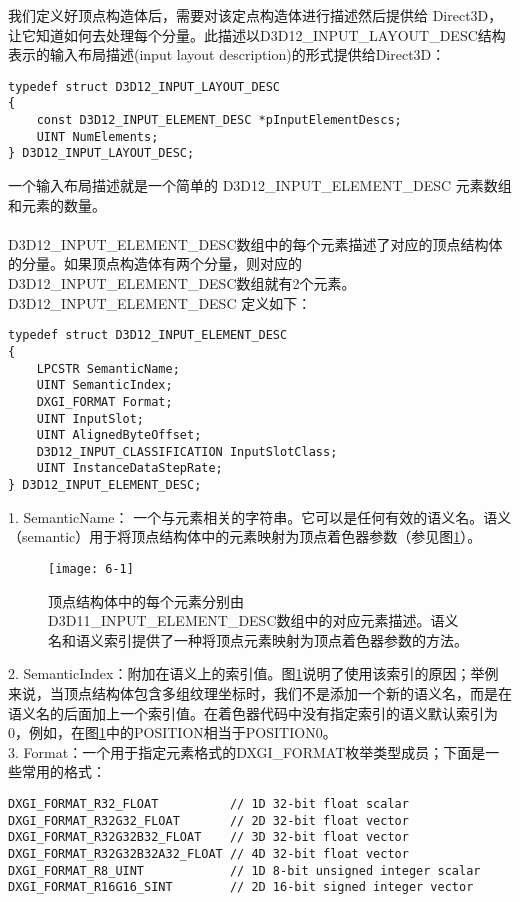 \begin{flushleft}
我们定义好顶点构造体后，需要对该定点构造体进行描述然后提供给 Direct3D，让它知道如何去处理每个分量。此描述以D3D12\_INPUT\_LAYOUT\_DESC结构表示的输入布局描述(input layout description)的形式提供给Direct3D：
\begin{lstlisting}
typedef struct D3D12_INPUT_LAYOUT_DESC
{
    const D3D12_INPUT_ELEMENT_DESC *pInputElementDescs;
    UINT NumElements;
} D3D12_INPUT_LAYOUT_DESC;
\end{lstlisting}
一个输入布局描述就是一个简单的 D3D12\_INPUT\_ELEMENT\_DESC 元素数组和元素的数量。\\
~\\
D3D12\_INPUT\_ELEMENT\_DESC数组中的每个元素描述了对应的顶点结构体的分量。如果顶点构造体有两个分量，则对应的 D3D12\_INPUT\_ELEMENT\_DESC数组就有2个元素。D3D12\_INPUT\_ELEMENT\_DESC 定义如下：
\begin{lstlisting}
typedef struct D3D12_INPUT_ELEMENT_DESC
{
    LPCSTR SemanticName;
    UINT SemanticIndex;
    DXGI_FORMAT Format;
    UINT InputSlot;
    UINT AlignedByteOffset;
    D3D12_INPUT_CLASSIFICATION InputSlotClass;
    UINT InstanceDataStepRate;
} D3D12_INPUT_ELEMENT_DESC;
\end{lstlisting}
1. SemanticName： 一个与元素相关的字符串。它可以是任何有效的语义名。语义（semantic）用于将顶点结构体中的元素映射为顶点着色器参数（参见图\ref{fig:6-1}）。\\
\begin{figure}[h]
    \texttt{[image: 6-1]}
    \centering
    \caption{顶点结构体中的每个元素分别由D3D11\_INPUT\_ELEMENT\_DESC数组中的对应元素描述。语义名和语义索引提供了一种将顶点元素映射为顶点着色器参数的方法。}
    \label{fig:6-1}
\end{figure}
2. SemanticIndex：附加在语义上的索引值。图\ref{fig:6-1}说明了使用该索引的原因；举例来说，当顶点结构体包含多组纹理坐标时，我们不是添加一个新的语义名，而是在语义名的后面加上一个索引值。在着色器代码中没有指定索引的语义默认索引为0，例如，在图\ref{fig:6-1}中的POSITION相当于POSITION0。\\
3. Format：一个用于指定元素格式的DXGI\_FORMAT枚举类型成员；下面是一些常用的格式：
\begin{lstlisting}
DXGI_FORMAT_R32_FLOAT          // 1D 32-bit float scalar
DXGI_FORMAT_R32G32_FLOAT       // 2D 32-bit float vector
DXGI_FORMAT_R32G32B32_FLOAT    // 3D 32-bit float vector
DXGI_FORMAT_R32G32B32A32_FLOAT // 4D 32-bit float vector
DXGI_FORMAT_R8_UINT            // 1D 8-bit unsigned integer scalar
DXGI_FORMAT_R16G16_SINT        // 2D 16-bit signed integer vector

\end{lstlisting}
\end{flushleft}
